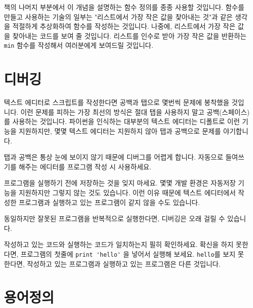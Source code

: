 책의 나머지 부분에서 이 개념을 설명하는 함수 정의를 종종 사용할 것입니다. 함수를 만들고 사용하는 기술의 일부는 "리스트에서 가장 작은 값을 찾아내는 것"과 같은 
생각을 적절하게 추상화하여 함수를 작성하는 것입니다. 나중에, 리스트에서 가장 작은 값을 찾아내는 코드를 보여 줄 것입니다. 리스트를 인수로 받아 가장 작은 값을 
반환하는 {\tt min} 함수를 작성해서 여러분에게 보여드릴 것입니다.

\section{디버깅}
\label{editor}

텍스트 에디터로 스크립트를 작성한다면 공백과 탭으로 몇번씩 문제에 봉착했을 것입니다. 이런 문제를 피하는 가장 최선의 방식은 절대 탭을 사용하지 말고
공백(스페이스)를 사용하는 것입니다. 파이썬을 인식하는 대부분의 텍스트 에디터는 디폴트로 이런 기능을 지원하지만, 몇몇 텍스트 에디터는 지원하지 않아 탭과 공백으로 문제를 야기합니다.


탭과 공백은 통상 눈에 보이지 않기 때문에 디버그를 어렵게 합니다. 자동으로 들여쓰기를 해주는 에디터를 프로그램 작성 시 사용하세요.

프로그램을 실행하기 전에 저장하는 것을 잊지 마세요. 몇몇 개발 환경은 자동저장 기능을 지원하지만 그렇지 않는 것도 있습니다.
이런 이유 때문에 텍스트 에디터에서 작성한 프로그램과 실행하고 있는 프로그램이 같지 않을 수도 있습니다.

동일하지만 잘못된 프로그램을 반복적으로 실행한다면, 디버깅은 오래 걸릴 수 있습니다.

작성하고 있는 코드와 실행하는 코드가 일치하는지 필히 확인하세요. 확신을 하지 못한다면, 프로그램의 첫줄에 \verb"print 'hello'" 을 넣어서 실행해 보세요.
\verb"hello"를 보지 못한다면, 작성하고 있는 프로그램과 실행하고 있는 프로그램은 다른 것입니다.


\section{용어정의}

